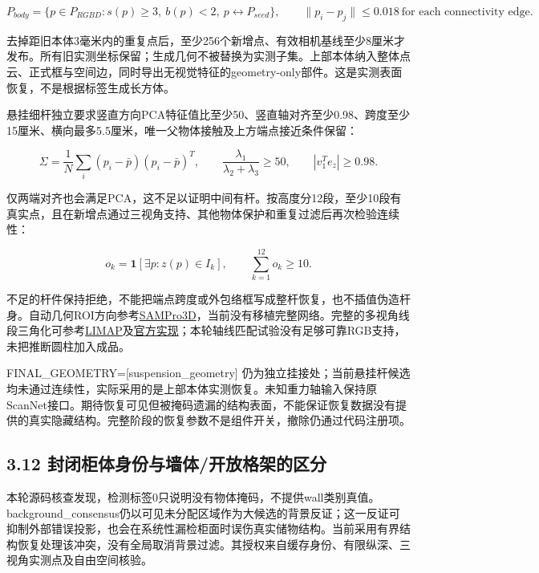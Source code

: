 \documentclass[UTF8,fontset=fandol]{ctexart}
\begin{document}
\[
P_{body}=\{p\in P_{RGBD}:s(p)\ge3,\ b(p)<2,\ p\leftrightarrow P_{seed}\},\qquad
\|p_i-p_j\|\le0.018\ \text{for each connectivity edge}.
\]

去掉距旧本体3毫米内的重复点后，至少256个新增点、有效相机基线至少8厘米才发布。所有旧实测坐标保留；生成几何不被替换为实测子集。上部本体纳入整体点云、正式框与空间边，同时导出无视觉特征的geometry-only部件。这是实测表面恢复，不是根据标签生成长方体。



悬挂细杆独立要求竖直方向PCA特征值比至少50、竖直轴对齐至少0.98、跨度至少15厘米、横向最多5.5厘米，唯一父物体接触及上方端点接近条件保留：



\[
\Sigma=\frac1N\sum_i(p_i-\bar p)(p_i-\bar p)^T,\qquad
\frac{\lambda_1}{\lambda_2+\lambda_3}\ge50,\qquad |v_1^Te_z|\ge0.98.
\]

仅两端对齐也会满足PCA，这不足以证明中间有杆。按高度分12段，至少10段有真实点，且在新增点通过三视角支持、其他物体保护和重复过滤后再次检验连续性：



\[
o_k=\mathbf1[\exists p:z(p)\in I_k],\qquad \sum_{k=1}^{12}o_k\ge10.
\]

不足的杆件保持拒绝，不能把端点跨度或外包络框写成整杆恢复，也不插值伪造杆身。自动几何ROI方向参考\href{https://mutianxu.github.io/sampro3d/}{SAMPro3D}，当前没有移植完整网络。完整的多视角线段三角化可参考\href{https://openaccess.thecvf.com/content/CVPR2023/html/Liu\_3D\_Line\_Mapping\_Revisited\_CVPR\_2023\_paper.html}{LIMAP}及\href{https://github.com/cvg/limap}{官方实现}；本轮轴线匹配试验没有足够可靠RGB支持，未把推断圆柱加入成品。



FINAL\_GEOMETRY=[suspension\_geometry] 仍为独立挂接处；当前悬挂杆候选均未通过连续性，实际采用的是上部本体实测恢复。未知重力轴输入保持原ScanNet接口。期待恢复可见但被掩码遗漏的结构表面，不能保证恢复数据没有提供的真实隐藏结构。完整阶段的恢复参数不是组件开关，撤除仍通过代码注册项。



\subsection*{3.12 封闭柜体身份与墙体/开放格架的区分}

本轮源码核查发现，检测标签0只说明没有物体掩码，不提供wall类别真值。background\_consensus仍以可见未分配区域作为大候选的背景反证；这一反证可抑制外部错误投影，也会在系统性漏检柜面时误伤真实储物结构。当前采用有界结构恢复处理该冲突，没有全局取消背景过滤。其授权来自缓存身份、有限纵深、三视角实测点及自由空间核验。
\end{document}
